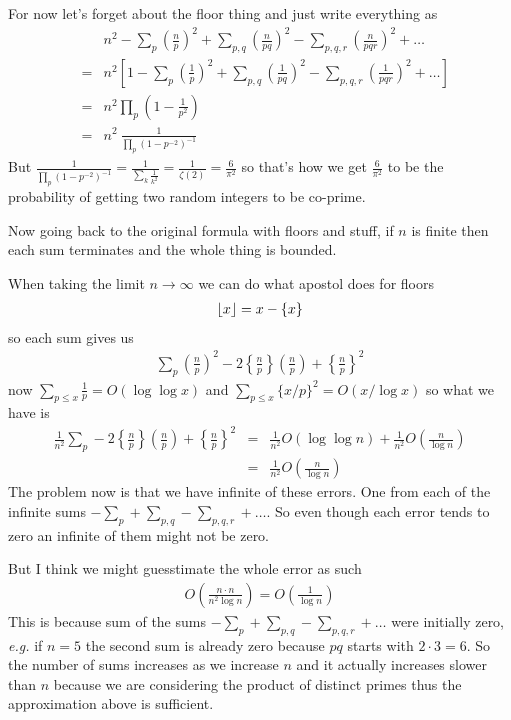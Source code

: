 \documentclass[aps,preprint,preprintnumbers,nofootinbib,showpacs,prd]{revtex4-1}
\newcommand{\eg}{{\it e.g.} }
\newcommand{\nbea}{\begin{eqnarray*}}
\newcommand{\neea}{\end{eqnarray*}}
\DeclarePairedDelimiter{\floor}{\lfloor}{\rfloor}
\begin{document}
\begin{enumerate}
For now let's forget about the floor thing and just write everything as
%
\nbea
&& n^2 - \sum_p \left ( \frac{n}{p}\right )^2 + \sum_{p,q} \left ( \frac{n}{pq}\right )^2 - \sum_{p,q,r} \left ( \frac{n}{pqr}\right )^2 + \dots \\
& = & n^2 \left \lbrack 1 - \sum_p \left ( \frac{1}{p}\right )^2 + \sum_{p,q} \left ( \frac{1}{pq}\right )^2 - \sum_{p,q,r} \left ( \frac{1}{pqr}\right )^2 + \dots \right \rbrack \\
& = & n^2 \prod_p \left ( 1- \frac{1}{p^2}\right ) \\
& = & n^2 ~ \frac{1}{\prod_p \left ( 1- p^{-2}\right )^{-1}} 
\neea
%
But $\frac{1}{\prod_p \left ( 1- p^{-2}\right )^{-1}} = \frac{1}{\sum_k \frac{1}{k^2}} = \frac{1}{\zeta(2)} = \frac{6}{\pi^2}$ so that's how we get $\frac{6}{\pi^2}$ to be the probability of getting two random integers to be co-prime.

Now going back to the original formula with floors and stuff, if $n$ is finite then each sum terminates and the whole thing is bounded.

When taking the limit $n \to \infty$ we can do what apostol does for floors
%
\nbea
\floor{x} = x - \{ x \}
\neea
%
so each sum gives us
%
\nbea
\sum_p \left ( \frac{n}{p} \right )^2 - 2 \left \{ \frac{n}{p} \right \} \left ( \frac{n}{p} \right ) + \left \{ \frac{n}{p} \right \}^2
\neea
%
now $\sum_{p \le x} \frac{1}{p} = O(\log\log x)$ and $\sum_{p \le x} \{x/p\}^2 = O(x/\log x)$ so what we have is 
%
\nbea
\frac{1}{n^2} \sum_p - 2 \left \{ \frac{n}{p} \right \} \left ( \frac{n}{p} \right ) + \left \{ \frac{n}{p} \right \}^2 & = &\frac{1}{n^2} O(\log\log n) + \frac{1}{n^2}O\left(\frac{n}{\log n}\right) \\
& = & \frac{1}{n^2} O\left ( \frac{n}{\log n} \right )
\neea
%
The problem now is that we have infinite of these errors. One from each of the infinite sums $-\sum_p + \sum_{p,q} - \sum_{p,q,r} + \dots$. So even though each error tends to zero an infinite of them might not be zero.

But I think we might guesstimate the whole error as such 
%
\nbea
O\left ( \frac{n\cdot n}{n^2 \log n} \right ) = O \left ( \frac{1}{\log n} \right )
\neea
%
This is because sum of the sums $-\sum_p + \sum_{p,q} - \sum_{p,q,r} + \dots$ were initially zero, \eg if $n = 5$ the second sum is already zero because $pq$ starts with $2\cdot3 = 6$. So the number of sums increases as we increase $n$ and it actually increases slower than $n$ because we are considering the product of distinct primes thus the approximation above is sufficient.


\end{enumerate}
\end{document}
